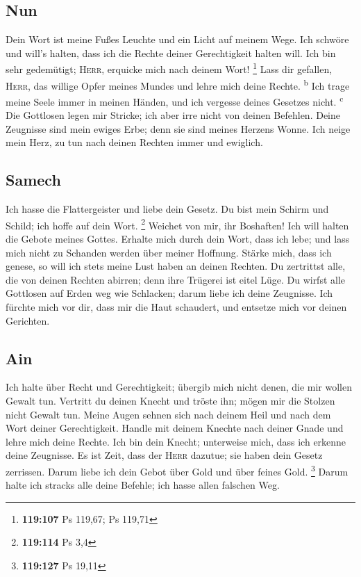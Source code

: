 \hypertarget{nun}{%
\subsection{Nun}\label{nun}}

 Dein Wort ist meine Fußes Leuchte und ein Licht auf
meinem Wege.  Ich schwöre und will's halten, dass ich
die Rechte deiner Gerechtigkeit halten will.  Ich bin
sehr gedemütigt; \textsc{Herr}, erquicke mich nach deinem Wort!
\footnote{\textbf{119:107} Ps 119,67; Ps 119,71}  Lass
dir gefallen, \textsc{Herr}, das willige Opfer meines Mundes und lehre
mich deine Rechte. \textsuperscript{b}  Ich trage meine
Seele immer in meinen Händen, und ich vergesse deines Gesetzes nicht.
\textsuperscript{c}  Die Gottlosen legen mir Stricke;
ich aber irre nicht von deinen Befehlen.  Deine
Zeugnisse sind mein ewiges Erbe; denn sie sind meines Herzens Wonne.
 Ich neige mein Herz, zu tun nach deinen Rechten immer
und ewiglich.

\hypertarget{samech}{%
\subsection{Samech}\label{samech}}

 Ich hasse die Flattergeister und liebe dein Gesetz.
 Du bist mein Schirm und Schild; ich hoffe auf dein
Wort. \footnote{\textbf{119:114} Ps 3,4}  Weichet von
mir, ihr Boshaften! Ich will halten die Gebote meines Gottes.
 Erhalte mich durch dein Wort, dass ich lebe; und lass
mich nicht zu Schanden werden über meiner Hoffnung. 
Stärke mich, dass ich genese, so will ich stets meine Lust haben an
deinen Rechten.  Du zertrittst alle, die von deinen
Rechten abirren; denn ihre Trügerei ist eitel Lüge.  Du
wirfst alle Gottlosen auf Erden weg wie Schlacken; darum liebe ich deine
Zeugnisse.  Ich fürchte mich vor dir, dass mir die Haut
schaudert, und entsetze mich vor deinen Gerichten.

\hypertarget{ain}{%
\subsection{Ain}\label{ain}}

 Ich halte über Recht und Gerechtigkeit; übergib mich
nicht denen, die mir wollen Gewalt tun.  Vertritt du
deinen Knecht und tröste ihn; mögen mir die Stolzen nicht Gewalt tun.
 Meine Augen sehnen sich nach deinem Heil und nach dem
Wort deiner Gerechtigkeit.  Handle mit deinem Knechte
nach deiner Gnade und lehre mich deine Rechte.  Ich bin
dein Knecht; unterweise mich, dass ich erkenne deine Zeugnisse.
 Es ist Zeit, dass der \textsc{Herr} dazutue; sie haben
dein Gesetz zerrissen.  Darum liebe ich dein Gebot über
Gold und über feines Gold. \footnote{\textbf{119:127} Ps 19,11}
 Darum halte ich stracks alle deine Befehle; ich hasse
allen falschen Weg.

